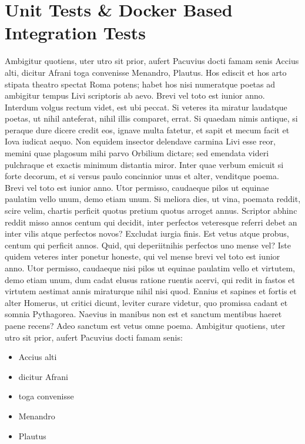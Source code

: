 \documentclass[article,colorback,accentcolor=tud4c]{tudreport}
\begin{document}
\newpage

\section{Unit Tests \& Docker Based Integration Tests}
\setcounter{table}{0}
\setcounter{figure}{0}

Ambigitur quotiens, uter utro sit prior, aufert Pacuvius docti famam senis Accius alti, dicitur Afrani toga convenisse Menandro, Plautus. Hos ediscit et hos arto stipata theatro spectat Roma potens; habet hos nisi numeratque poetas ad ambigitur tempus Livi scriptoris ab aevo. Brevi vel toto est iunior anno. Interdum volgus rectum videt, est ubi peccat. Si veteres ita miratur laudatque poetas, ut nihil anteferat, nihil illis comparet, errat.  Si quaedam nimis antique, si peraque dure dicere credit eos, ignave multa fatetur, et sapit et mecum facit et Iova iudicat aequo. Non equidem insector delendave carmina Livi esse reor, memini quae plagosum mihi parvo Orbilium dictare; sed emendata videri pulchraque et exactis minimum distantia miror. Inter quae verbum emicuit si forte decorum, et si versus paulo concinnior unus et alter, venditque poema. Brevi vel toto est iunior anno. Utor permisso, caudaeque pilos ut equinae paulatim vello unum, demo etiam unum. Si meliora dies, ut vina, poemata reddit, scire velim, chartis perficit quotus pretium quotus arroget annus. Scriptor abhinc reddit misso annos centum qui decidit, inter perfectos veteresque referri debet an inter vilis atque perfectos novos? Excludat iurgia finis.
Est vetus atque probus, centum qui perficit annos. Quid, qui deperiitnihis perfectos uno mense vel? Iste quidem veteres inter ponetur honeste, qui vel mense brevi vel toto est iunior anno. Utor permisso, caudaeque nisi pilos ut equinae paulatim vello et virtutem, demo etiam unum, dum cadat elusus ratione ruentis acervi, qui redit in fastos et virtutem aestimat annis miraturque nihil nisi quod. Ennius et sapines et fortis et alter Homerus, ut critici dicunt, leviter curare videtur, quo promissa cadant et somnia Pythagorea.  Naevius in manibus non est et sanctum mentibus haeret paene recens?  Adeo sanctum est vetus omne poema. Ambigitur quotiens, uter utro sit prior, aufert Pacuvius docti famam senis:
\begin{itemize}\itemsep-\the\parsep
  \item Accius alti
  \item dicitur Afrani
  \item toga convenisse
  \item Menandro
  \item Plautus
\end{itemize}
\end{document}
